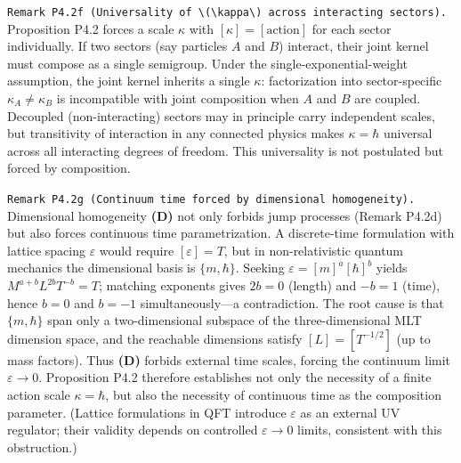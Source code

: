 \documentclass[
]{article}
\begin{document}
\texttt{Remark\ P4.2f\ (Universality\ of\ \textbackslash{}(\textbackslash{}kappa\textbackslash{})\ across\ interacting\ sectors).}
Proposition P4.2 forces a scale \(\kappa\) with
\([\kappa]=[\text{action}]\) for each sector individually. If two
sectors (say particles \(A\) and \(B\)) interact, their joint kernel
must compose as a single semigroup. Under the single-exponential-weight
assumption, the joint kernel inherits a single \(\kappa\): factorization
into sector-specific \(\kappa_A\neq\kappa_B\) is incompatible with joint
composition when \(A\) and \(B\) are coupled. Decoupled
(non-interacting) sectors may in principle carry independent scales, but
transitivity of interaction in any connected physics makes
\(\kappa=\hbar\) universal across all interacting degrees of freedom.
This universality is not postulated but forced by composition.

\texttt{Remark\ P4.2g\ (Continuum\ time\ forced\ by\ dimensional\ homogeneity).}
Dimensional homogeneity \textbf{(D)} not only forbids jump processes
(Remark P4.2d) but also forces continuous time parametrization. A
discrete-time formulation with lattice spacing \(\varepsilon\) would
require \([\varepsilon]=T\), but in non-relativistic quantum mechanics
the dimensional basis is \(\{m,\hbar\}\). Seeking
\(\varepsilon=[m]^a[\hbar]^b\) yields \(M^{a+b}L^{2b}T^{-b}=T\);
matching exponents gives \(2b=0\) (length) and \(-b=1\) (time), hence
\(b=0\) and \(b=-1\) simultaneously---a contradiction. The root cause is
that \(\{m,\hbar\}\) span only a two-dimensional subspace of the
three-dimensional MLT dimension space, and the reachable dimensions
satisfy \([L]=[T^{-1/2}]\) (up to mass factors). Thus \textbf{(D)}
forbids external time scales, forcing the continuum limit
\(\varepsilon\to 0\). Proposition P4.2 therefore establishes not only
the necessity of a finite action scale \(\kappa=\hbar\), but also the
necessity of continuous time as the composition parameter. (Lattice
formulations in QFT introduce \(\varepsilon\) as an external UV
regulator; their validity depends on controlled \(\varepsilon\to 0\)
limits, consistent with this obstruction.)
\end{document}

